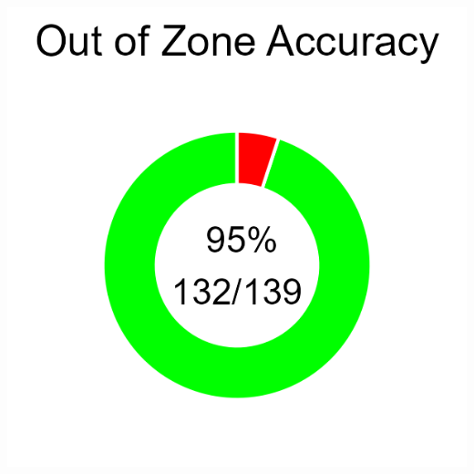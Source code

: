 \documentclass[
]{article}
\begin{document}
\begin{center}
\begin{minipage}[t]{0.2\textwidth}
\includegraphics{plots/oz_accuracy.png}
\end{minipage}
\end{center}
\end{document}
